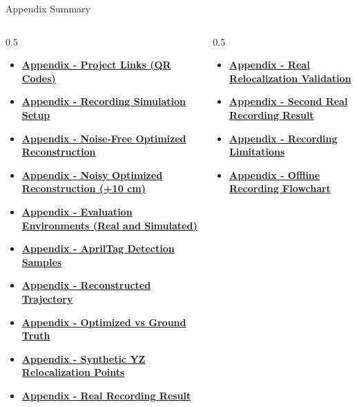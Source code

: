 \documentclass[aspectratio=169, 10pt]{beamer}
\begin{document}
\appendix
\begin{frame}[noframenumbering]{Appendix Summary}
\transfade[duration=0.25]
\begin{outlinecard}
  \tiny
  \begin{columns}[T,onlytextwidth]
    \begin{column}{0.5\textwidth}
      \begin{itemize}
        \item \hyperlink{appendix-project-links}{\textbf{Appendix - Project Links (QR Codes)}}
        \item \hyperlink{appendix-recording-setup}{\textbf{Appendix - Recording Simulation Setup}}
        \item \hyperlink{appendix-synth-noisefree}{\textbf{Appendix - Noise-Free Optimized Reconstruction}}
        \item \hyperlink{appendix-synth-noisy}{\textbf{Appendix - Noisy Optimized Reconstruction (+10 cm)}}
        \item \hyperlink{appendix-mosaic-architecture}{\textbf{Appendix - Evaluation Environments (Real and Simulated)}}
        \item \hyperlink{appendix-mosaic-detection}{\textbf{Appendix - AprilTag Detection Samples}}
        \item \hyperlink{appendix-mosaic-rec-traj}{\textbf{Appendix - Reconstructed Trajectory}}
        \item \hyperlink{appendix-mosaic-compare-gt}{\textbf{Appendix - Optimized vs Ground Truth}}
        \item \hyperlink{appendix-mosaic-synth-points}{\textbf{Appendix - Synthetic YZ Relocalization Points}}
        \item \hyperlink{appendix-mosaic-real-recording}{\textbf{Appendix - Real Recording Result}}
      \end{itemize}
    \end{column}
    \begin{column}{0.5\textwidth}
      \begin{itemize}
        \item \hyperlink{appendix-mosaic-real-relocal}{\textbf{Appendix - Real Relocalization Validation}}
        \item \hyperlink{appendix-mosaic-second-recording}{\textbf{Appendix - Second Real Recording Result}}
        \item \hyperlink{appendix-discussion-recording-limitations}{\textbf{Appendix - Recording Limitations}}
        \item \hyperlink{appendix-flowchart-recording}{\textbf{Appendix - Offline Recording Flowchart}}

\end{itemize}
\end{column}
\end{columns}
\end{outlinecard}
\end{frame}
\end{document}
